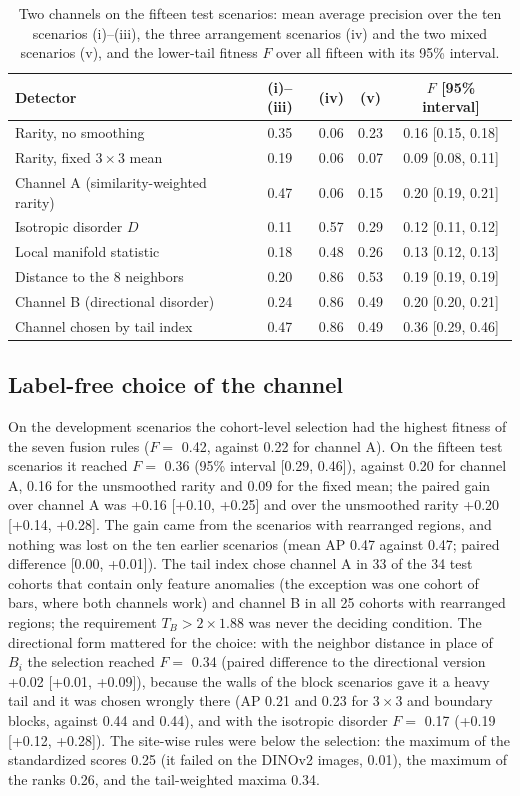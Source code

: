 \documentclass[final,5p,times,twocolumn,authoryear]{elsarticle}
\begin{document}
\begin{table}[t]
\caption{Two channels on the fifteen test scenarios: mean average precision over the ten scenarios (i)--(iii), the three arrangement scenarios (iv) and the two mixed scenarios (v), and the lower-tail fitness $F$ over all fifteen with its 95\% interval.}
\label{tab:tc}
\centering\footnotesize\setlength{\tabcolsep}{2.5pt}
\begin{tabular}{lcccc}
\toprule
Detector & (i)--(iii) & (iv) & (v) & $F$ [95\% interval]\\
\midrule
Rarity, no smoothing & 0.35 & 0.06 & 0.23 & 0.16 [0.15, 0.18] \\
Rarity, fixed $3\times3$ mean & 0.19 & 0.06 & 0.07 & 0.09 [0.08, 0.11] \\
Channel A (similarity-weighted rarity) & 0.47 & 0.06 & 0.15 & 0.20 [0.19, 0.21] \\
Isotropic disorder $D$ & 0.11 & 0.57 & 0.29 & 0.12 [0.11, 0.12] \\
Local manifold statistic & 0.18 & 0.48 & 0.26 & 0.13 [0.12, 0.13] \\
Distance to the 8 neighbors & 0.20 & 0.86 & 0.53 & 0.19 [0.19, 0.19] \\
Channel B (directional disorder) & 0.24 & 0.86 & 0.49 & 0.20 [0.20, 0.21] \\
\midrule
Channel chosen by tail index & 0.47 & 0.86 & 0.49 & 0.36 [0.29, 0.46] \\
\bottomrule
\end{tabular}
\end{table}

\subsection{Label-free choice of the channel}
On the development scenarios the cohort-level selection had the highest fitness of the seven fusion rules ($F=$ 0.42, against 0.22 for channel A). On the fifteen test scenarios it reached $F=$ 0.36 (95\% interval [0.29, 0.46]), against 0.20 for channel A, 0.16 for the unsmoothed rarity and 0.09 for the fixed mean; the paired gain over channel A was +0.16 [+0.10, +0.25] and over the unsmoothed rarity +0.20 [+0.14, +0.28]. The gain came from the scenarios with rearranged regions, and nothing was lost on the ten earlier scenarios (mean AP 0.47 against 0.47; paired difference [0.00, +0.01]). The tail index chose channel A in 33 of the 34 test cohorts that contain only feature anomalies (the exception was one cohort of bars, where both channels work) and channel B in all 25 cohorts with rearranged regions; the requirement $T_B>2\times1.88$ was never the deciding condition. The directional form mattered for the choice: with the neighbor distance in place of $B_i$ the selection reached $F=$ 0.34 (paired difference to the directional version +0.02 [+0.01, +0.09]), because the walls of the block scenarios gave it a heavy tail and it was chosen wrongly there (AP 0.21 and 0.23 for $3\times3$ and boundary blocks, against 0.44 and 0.44), and with the isotropic disorder $F=$ 0.17 (+0.19 [+0.12, +0.28]). The site-wise rules were below the selection: the maximum of the standardized scores 0.25 (it failed on the DINOv2 images, 0.01), the maximum of the ranks 0.26, and the tail-weighted maxima 0.34.
\end{document}
